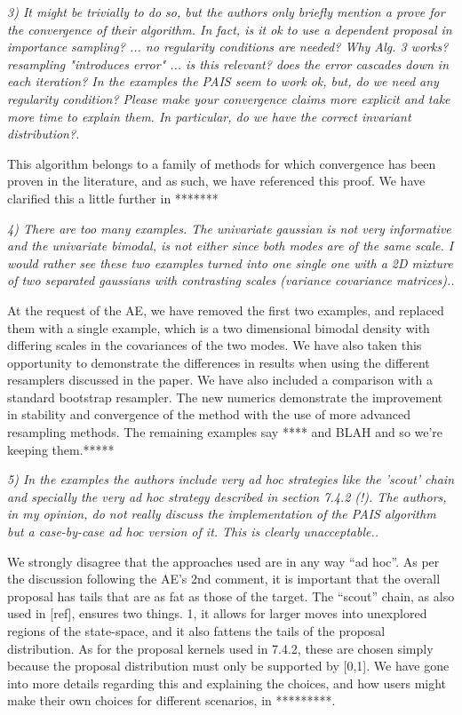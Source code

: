 \documentclass{article}
\newcommand{\comment}[2]{\vspace{0.6cm}{\bf Comment:} {\it #1.}

\vspace{0.3cm}{\bf Answer:} #2}
\begin{document}
\comment{3) It might be trivially to do so, but the authors only briefly mention a prove for the convergence of their algorithm. In fact, is it ok to use a dependent proposal in importance sampling? ... no regularity conditions are needed? Why Alg. 3 works? resampling "introduces error" ... is this relevant? does the error cascades down in each iteration? In the examples the PAIS seem to work ok, but, do we need any regularity condition? Please make your convergence claims more explicit and take more time to explain them. In particular, do we have the correct invariant distribution?}{This algorithm belongs to a family of methods for which convergence has been proven in the literature, and as such, we have referenced this proof. We have clarified this a little further in *******}

\comment{4) There are too many examples. The univariate gaussian is not very informative and the univariate bimodal, is not either since both modes are of the same scale. I would rather see these two examples turned into one single one with a 2D mixture of two separated gaussians with contrasting scales (variance covariance matrices).}{At the request of the AE, we have removed the first two examples, and replaced them with a single example, which is a two dimensional bimodal density with differing scales in the covariances of the two modes. We have also taken this opportunity to demonstrate the differences in results when using the different resamplers discussed in the paper. We have also included a comparison with a standard bootstrap resampler. The new numerics demonstrate the improvement in stability and convergence of the method with the use of more advanced resampling methods. The remaining examples say **** and BLAH and so we're keeping them.*****}

\comment{5) In the examples the authors include very ad hoc strategies like the 'scout' chain and specially the very ad hoc strategy described in section 7.4.2 (!). The authors, in my opinion, do not really discuss the implementation of the PAIS algorithm but a case-by-case ad hoc version of it. This is clearly unacceptable.}{We strongly disagree that the approaches used are in any way ``ad hoc''. As per the discussion following the AE's 2nd comment, it is important that the overall proposal has tails that are as fat as those of the target. The ``scout'' chain, as also used in [ref], ensures two things. 1, it allows for larger moves into unexplored regions of the state-space, and it also fattens the tails of the proposal distribution. As for the proposal kernels used in 7.4.2, these are chosen simply because the proposal distribution must only be supported by [0,1]. We have gone into more details regarding this and explaining the choices, and how users might make their own choices for different scenarios, in *********.}
\end{document}
